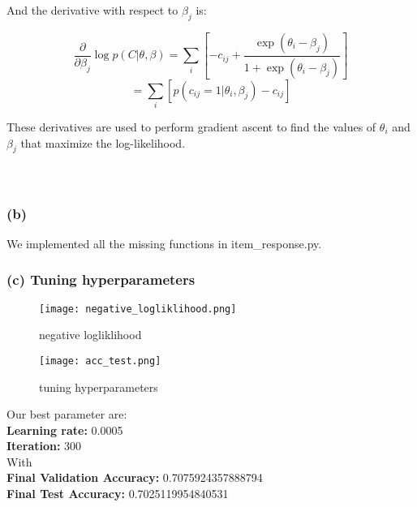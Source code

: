 \documentclass{article}
\begin{document}
And the derivative with respect to \( \beta_j \) is:

\[ \frac{\partial}{\partial \beta_j} \log p(C|\theta, \beta) = \sum_{i} \left[ -c_{ij} + \frac{\exp(\theta_i - \beta_j)}{1 + \exp(\theta_i - \beta_j)} \right] \]
\[ = \sum_{i} \left[ p(c_{ij} = 1|\theta_i, \beta_j) - c_{ij} \right] \]

These derivatives are used to perform gradient ascent to find the values of \( \theta_i \) and \( \beta_j \) that maximize the log-likelihood.
\\
\\
\\
\subsubsection*{(b)}
We implemented all the missing functions in item\_response.py.
\subsubsection*{(c) Tuning  hyperparameters}

\begin{figure}[H]
    \centering
    \texttt{[image: negative\_logliklihood.png]}
    \caption{negative logliklihood}
    \label{fig:enter-label}
\end{figure}

\begin{figure}[H]
    \centering
    \texttt{[image: acc\_test.png]}
    \caption{tuning  hyperparameters}
    \label{fig:enter-label}
\end{figure}
Our best parameter are:\\
\textbf{Learning rate:} 0.0005\\
\textbf{Iteration:} 300\\
With\\
\textbf{Final Validation Accuracy:} 0.7075924357888794\\
\textbf{Final Test Accuracy:} 0.7025119954840531
\newpage
\end{document}
